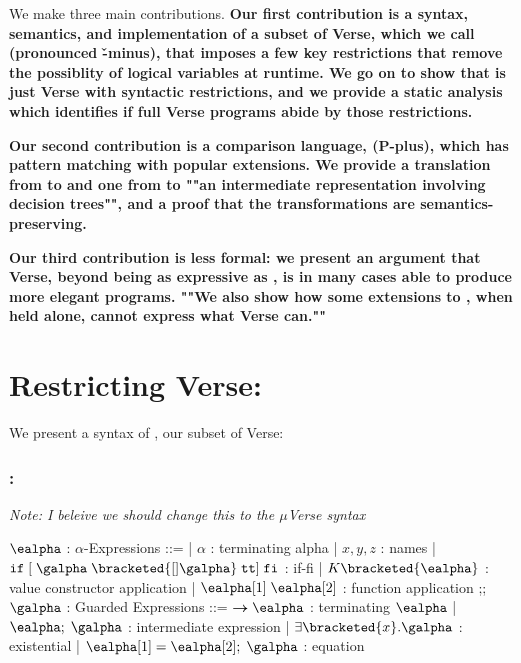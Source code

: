 \documentclass[]{article}
\begin{document}
We make three main contributions. \bf{Our first contribution} is a syntax,
semantics, and implementation of a subset of Verse, which we call {\VMinus}
(pronounced \v-minus), that imposes a few key restrictions that remove the
possiblity of logical variables at runtime. We go on
to show that {\VMinus} is just Verse with syntactic restrictions, and we provide a
static analysis which identifies if full Verse programs abide by those
restrictions. 


\bf{Our second contribution} is a comparison language, {\PPlus} (P-plus), which
has pattern matching with popular extensions. We provide  a translation from
{\PPlus} to {\VMinus} and one from {\VMinus} to ""an intermediate representation
involving decision trees"", and a proof that the transformations are
semantics-preserving. 

\bf{Our third contribution} is less formal: we present an argument that Verse,
beyond being as expressive as {\PPlus}, is in many cases able to produce more elegant
programs. ""We also show how some extensions to {\PPlus}, when held alone, cannot
express what Verse can.""

\section{Restricting Verse: {\VMinus}}

We present a syntax of {\VMinus}, our subset of Verse: 

\subsubsection{{\VMinus}:}
\it{Note: I beleive we should change this to the ${\mu}$Verse syntax}
\begin{center}
    \begin{bnf}
    $\ealpha$ : \textsf{$\alpha$-Expressions} ::=
    | $\alpha$ : terminating alpha
    | $x, y, z$ : names
    | $\tt{if}\; \tt{[}\; \galpha\; \bracketed{[] \galpha}\; tt{]}\; \tt{fi}$ : if-fi 
    | $K \bracketed{\ealpha}$ : value constructor application 
    | $\ealpha[1]\; \ealpha[2]$ : function application 
    ;;
    $\galpha$ : \textsf{Guarded Expressions} ::=  
    $\boldsymbol{\rightarrow}\ealpha$ : terminating $\ealpha$ 
    | $\ealpha;\; \galpha$ : intermediate expression 
    | $\exists \bracketed{x} \tt{.} \galpha$ : existential 
    | $\ealpha[1] = \ealpha[2];\; \galpha$ : equation 
    \end{bnf}
\end{center}
\end{document}
